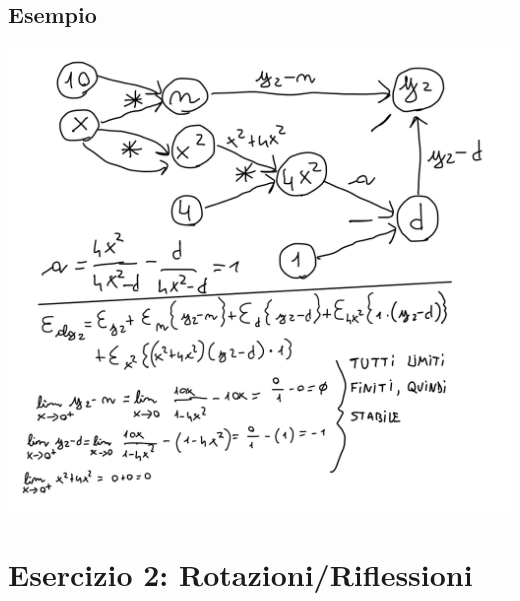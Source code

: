 \documentclass[10pt]{article}
\begin{document}
\subsection*{Esempio}
\begin{center}
    \includegraphics[scale=0.3]{grafo.png}
\end{center}
\section{Esercizio 2: Rotazioni/Riflessioni}
\end{document}

